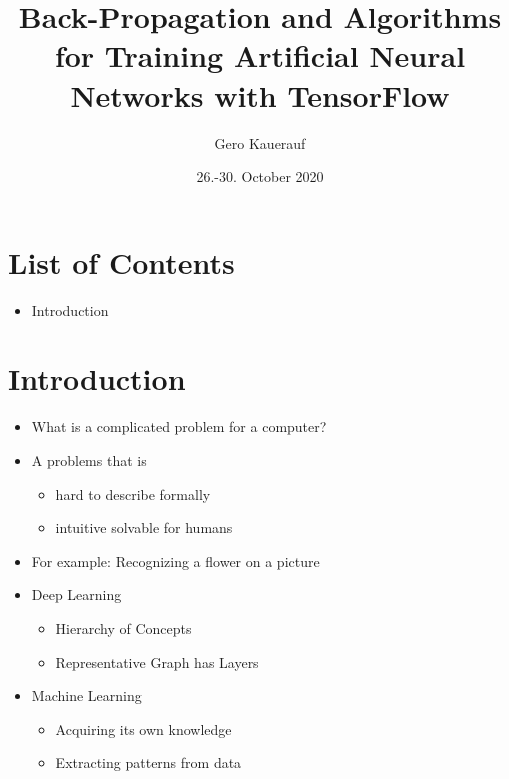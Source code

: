 \documentclass[t]{beamer}
\begin{document}

\title{Back-Propagation and Algorithms for Training Artificial Neural Networks with TensorFlow}
\date{26.-30. October 2020}
\author{Gero Kauerauf}

\frame{\titlepage}

\section{List of Contents}
\begin{frame}
    \begin{itemize}
        \item Introduction
    \end{itemize}
\end{frame}


\section{Introduction}
\begin{frame}
    \begin{itemize}
        \item What is a complicated problem for a computer?
        \item A problems that is
        \begin{itemize}
            \item hard to describe formally
            \item intuitive solvable for humans
        \end{itemize}
        \item For example: Recognizing a flower on a picture
        \item Deep Learning
        \begin{itemize}
            \item Hierarchy of Concepts
            \item Representative Graph has Layers
        \end{itemize}
        \item Machine Learning
        \begin{itemize}
            \item Acquiring its own knowledge
            \item Extracting patterns from data
        \end{itemize}
    \end{itemize}
\end{frame}
\end{document}
